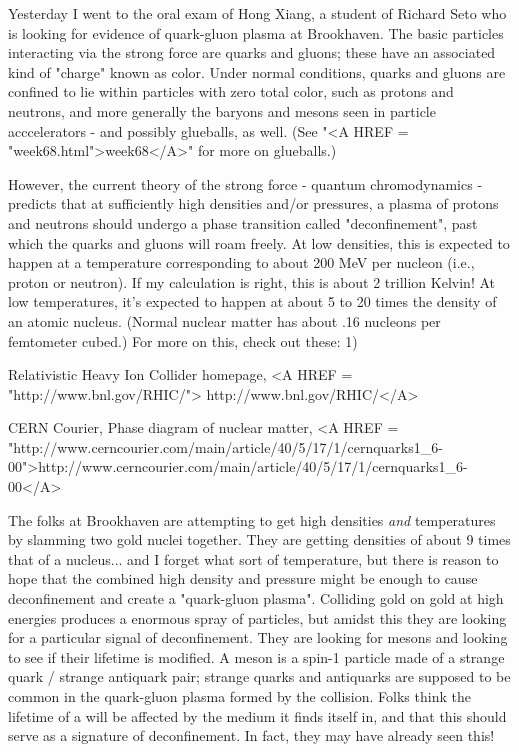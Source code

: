 



Yesterday I went to the oral exam of Hong Xiang, a student of Richard
Seto who is looking for evidence of quark-gluon plasma at Brookhaven.
The basic particles interacting via the strong force are quarks and
gluons; these have an associated kind of "charge" known as
color.  Under normal conditions, quarks and gluons are confined to lie
within particles with zero total color, such as protons and neutrons,
and more generally the baryons and mesons seen in particle acccelerators
- and possibly glueballs, as well.  (See "<A HREF =
"week68.html">week68</A>" for more on glueballs.)


However, the current theory of the strong force - quantum
chromodynamics - predicts that at sufficiently high densities and/or
pressures, a plasma of protons and neutrons should undergo a phase
transition called "deconfinement", past which the quarks and
gluons will roam freely.  At low densities, this is expected to happen
at a temperature corresponding to about 200 MeV per nucleon (i.e.,
proton or neutron).  If my calculation is right, this is about 2
trillion Kelvin!  At low temperatures, it's expected to happen at about
5 to 20 times the density of an atomic nucleus.  (Normal nuclear matter
has about .16 nucleons per femtometer cubed.)  For more on this, check
out these:
1) 

Relativistic Heavy Ion Collider homepage, 
<A HREF = "http://www.bnl.gov/RHIC/">
http://www.bnl.gov/RHIC/</A>


 CERN Courier, Phase diagram of nuclear matter,
<A HREF = "http://www.cerncourier.com/main/article/40/5/17/1/cernquarks1_6-00">http://www.cerncourier.com/main/article/40/5/17/1/cernquarks1_6-00</A>

The folks at Brookhaven are attempting to get high densities \emph{and}
temperatures by slamming two gold nuclei together.  They are getting
densities of about 9 times that of a nucleus... and I forget what sort
of temperature, but there is reason to hope that the combined high
density and pressure might be enough to cause deconfinement and create a
"quark-gluon plasma".  Colliding gold on gold at high energies
produces a enormous spray of particles, but amidst this they are looking
for a particular signal of deconfinement.  They are looking for \phi 
mesons and looking to see if their lifetime is modified.  A \phi  meson is
a spin-1 particle made of a strange quark / strange antiquark pair;
strange quarks and antiquarks are supposed to be common in the
quark-gluon plasma formed by the collision.  Folks think the lifetime of
a \phi  will be affected by the medium it finds itself in, and that this
should serve as a signature of deconfinement.  In fact, they may have
already seen this!

